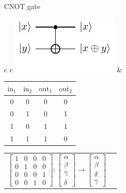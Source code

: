 \begin{frame}{CNOT gate}
\centering
\begin{tabular}{c c}
\includegraphics[valign=c,page=1,scale=1.1]{pics/two_qubit_gates.pdf} &
\begin{tabular}{cc|cc}
$\text{in}_1$ & $\text{in}_2$ & $\text{out}_1$ & $\text{out}_2$ \\
\hline
0 & 0 & 0 & 0\\
0 & 1 & 0 & 1\\
1 & 0 & 1 & 1\\
1 & 1 & 1 & 0 
\end{tabular}
\end{tabular}

\vspace{1.5cm}
\begin{tabularx}{\textwidth}{Xc}
\centering
$
\begin{bmatrix}
	1 & 0 & 0 & 0 \\
	0 & 1 & 0 & 0 \\
	0 & 0 & 0 & 1 \\
	0 & 0 & 1 & 0
\end{bmatrix}:
\begin{bmatrix}
	\alpha \\
	\beta  \\
	\gamma \\
	\delta
\end{bmatrix} \to
\begin{bmatrix}
	\alpha \\
	\beta  \\
	\delta \\
	\gamma
\end{bmatrix}
$
\end{tabularx}
\end{frame}


